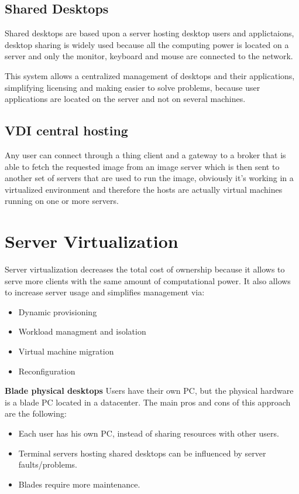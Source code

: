 \subsection{Shared Desktops}
Shared desktops are based upon a server hosting desktop users and applictaions, desktop sharing is widely used because all the computing power is located on a server and only the monitor, keyboard and mouse are connected to the network.

This system allows a centralized management of desktops and their applications, simplifying licensing and making easier to solve problems, because user applications are located on the server and not on several machines.
\subsection{VDI central hosting}
Any user can connect through a thing client and a gateway to a broker that is able to fetch the requested image from an image server which is then sent to another set of servers that are used to run the image, obviously it's working in a virtualized environment and therefore the hosts are actually virtual machines running on one or more servers.
\section{Server Virtualization}
Server virtualization decreases the total cost of ownership because it allows to serve more clients with the same amount of computational power. It also allows to increase server usage and simplifies management via:
\begin{itemize}
    \item Dynamic provisioning
    \item Workload managment and isolation
    \item Virtual machine migration
    \item Reconfiguration
\end{itemize}
\textbf{Blade physical desktops}
Users have their own PC, but the physical hardware is a blade PC located in a datacenter. The main pros and cons of this approach are the following:
\begin{itemize}
    \item Each user has his own PC, instead of sharing resources with other users.
    \item Terminal servers hosting shared desktops can be influenced by server faults/problems.
    \item Blades require more maintenance.
\end{itemize}
